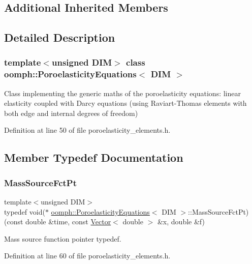 \subsection*{Additional Inherited Members}


\subsection{Detailed Description}
\subsubsection*{template$<$unsigned D\+IM$>$\newline
class oomph\+::\+Poroelasticity\+Equations$<$ D\+I\+M $>$}

Class implementing the generic maths of the poroelasticity equations\+: linear elasticity coupled with Darcy equations (using Raviart-\/\+Thomas elements with both edge and internal degrees of freedom) 

Definition at line 50 of file poroelasticity\+\_\+elements.\+h.



\subsection{Member Typedef Documentation}
\mbox{\label{classoomph_1_1PoroelasticityEquations_a8edb2644708db2f2ae03254ea3143262}} 
\subsubsection{\texorpdfstring{Mass\+Source\+Fct\+Pt}{MassSourceFctPt}}
{\footnotesize\ttfamily template$<$unsigned D\+IM$>$ \\
typedef void($\ast$ \hyperlink{classoomph_1_1PoroelasticityEquations}{oomph\+::\+Poroelasticity\+Equations}$<$ D\+IM $>$\+::Mass\+Source\+Fct\+Pt) (const double \&time, const \hyperlink{classoomph_1_1Vector}{Vector}$<$ double $>$ \&x, double \&f)}



Mass source function pointer typedef. 



Definition at line 60 of file poroelasticity\+\_\+elements.\+h.

